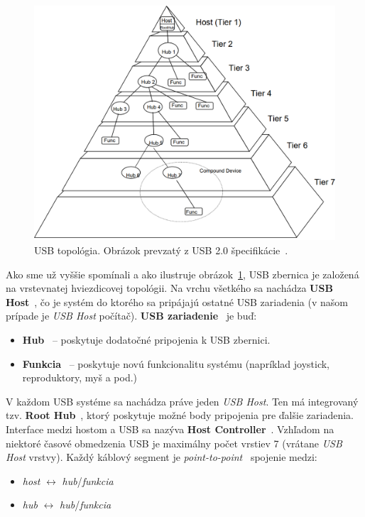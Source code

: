 \begin{figure}[!htb]
	\centering
	\includegraphics[width=\textwidth]{img/uvod_usb_topology}
	\caption{USB topológia. Obrázok prevzatý z USB 2.0 špecifikácie~\cite{usb_topology}.}
	\label{obr:uvod:usb_topology}
\end{figure}

Ako sme už vyššie spomínali a ako ilustruje obrázok~\ref{obr:uvod:usb_topology}, USB zbernica je založená na vrstevnatej hviezdicovej topológii. Na vrchu všetkého sa nachádza \textbf{USB Host}~\cite{usb_host}, čo je systém do ktorého sa pripájajú ostatné USB zariadenia (v našom prípade je \textit{USB Host} počítač). \textbf{USB zariadenie}~\cite{usb_device} je buď:
\begin{itemize}
\item \textbf{Hub}~\cite{usb_hub} -- poskytuje dodatočné pripojenia k USB zbernici.
\item \textbf{Funkcia}~\cite{usb_function} -- poskytuje novú funkcionalitu systému (napríklad joystick, reproduktory, myš a pod.)
\end{itemize}

 V každom USB systéme sa nachádza práve jeden \textit{USB Host}. Ten má integrovaný tzv. \textbf{Root Hub}~\cite{usb_host}, ktorý poskytuje možné body pripojenia pre ďalšie zariadenia. Interface medzi hostom a USB sa nazýva \textbf{Host Controller}~\cite{usb_host}. Vzhľadom na niektoré časové obmedzenia USB je maximálny počet vrstiev 7 (vrátane \textit{USB Host} vrstvy). Každý káblový segment je \textit{point-to-point}~\cite{usb_bus_topology} spojenie medzi:
\begin{itemize}
\item \textit{host} $\longleftrightarrow$ \textit{hub}/\textit{funkcia}
\item \textit{hub} $\longleftrightarrow$ \textit{hub}/\textit{funkcia}
\end{itemize}

